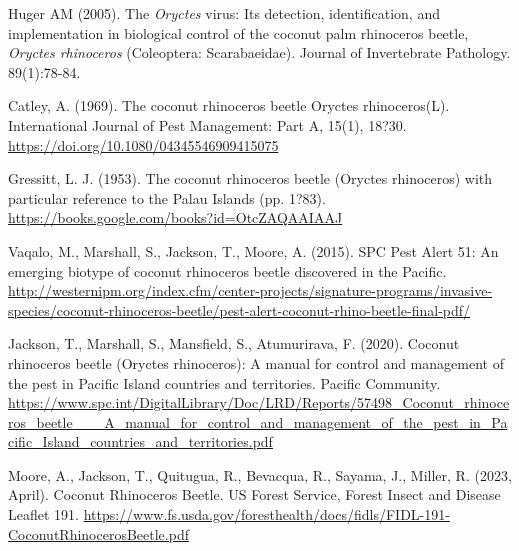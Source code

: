 \documentclass[11pt,english,letterpaper]{scrartcl}
\begin{document}
\begin{thebibliography}{1}

 Huger AM (2005). The \textit{Oryctes} virus: Its detection, identification, and implementation in biological control of the coconut palm rhinoceros beetle, \textit{Oryctes rhinoceros} (Coleoptera: Scarabaeidae). Journal of Invertebrate Pathology. 89(1):78-84.

 Catley, A. (1969). The coconut rhinoceros beetle Oryctes rhinoceros(L). International Journal of Pest Management: Part A, 15(1), 18?30. \url{https://doi.org/10.1080/04345546909415075}

 Gressitt, L. J. (1953). The coconut rhinoceros beetle (Oryctes rhinoceros) with particular reference to the Palau Islands (pp. 1?83). \url{https://books.google.com/books?id=OtcZAQAAIAAJ}

 Vaqalo, M., Marshall, S., Jackson, T., Moore, A. (2015). SPC Pest Alert 51: An emerging biotype of coconut rhinoceros beetle discovered in the Pacific. \url{http://westernipm.org/index.cfm/center-projects/signature-programs/invasive-species/coconut-rhinoceros-beetle/pest-alert-coconut-rhino-beetle-final-pdf/}

 Jackson, T., Marshall, S., Mansfield, S., Atumurirava, F. (2020). Coconut rhinoceros beetle (Oryctes rhinoceros): A manual for control and management of the pest in Pacific Island countries and territories. Pacific Community. \url{https://www.spc.int/DigitalLibrary/Doc/LRD/Reports/57498_Coconut_rhinoceros_beetle___A_manual_for_control_and_management_of_the_pest_in_Pacific_Island_countries_and_territories.pdf}

 Moore, A., Jackson, T., Quitugua, R., Bevacqua, R., Sayama, J., Miller, R. (2023, April). Coconut Rhinoceros Beetle. US Forest Service, Forest Insect and Disease Leaflet 191. \url{https://www.fs.usda.gov/foresthealth/docs/fidls/FIDL-191-CoconutRhinocerosBeetle.pdf}

\end{thebibliography}
\endgroup
\end{document}
